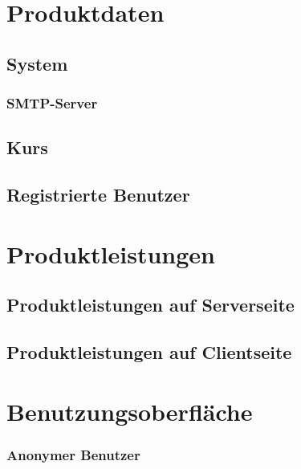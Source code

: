 \documentclass[a4paper]{scrreprt}
\begin{document}
		

\chapter{Produktdaten}
 \label{Produktdaten}
        
	
    \section{System}
	    
	    
	    
	    \subsection{SMTP-Server}
	    
	    
	    
	    	
	\section{Kurs}
	   
	    
	    
    
    
    		
    \section{Registrierte Benutzer}
	  
	    
	    
	   
	    
    
\chapter{Produktleistungen}
	

	\section{Produktleistungen auf Serverseite}
		
	\section{Produktleistungen auf Clientseite}
	
		
		
 
\chapter{Benutzungsoberfläche}
    
    
    \subsection{Anonymer Benutzer}
       	
\end{document}
